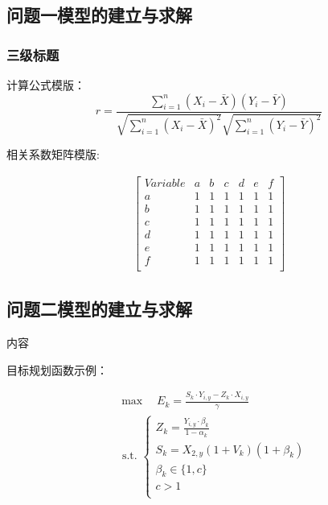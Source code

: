 \documentclass[a4paper]{article}
\begin{document}
	\subsection{问题一模型的建立与求解}
	\subsubsection{三级标题}
	
	计算公式模版：
	\begin{equation}
		r=\frac{\sum_{i=1}^n\left(X_i-\bar{X}\right)\left(Y_i-\bar{Y}\right)}{\sqrt{\sum_{i=1}^n\left(X_i-\bar{X}\right)^2} \sqrt{\sum_{i=1}^n\left(Y_i-\bar{Y}\right)^2}}
	\end{equation}
	
	相关系数矩阵模版:
	
	\begin{gather*}
		\begin{bmatrix}
			Variable & a & b & c & d & e & f \\
			a & 1 & 1 & 1 & 1 & 1 & 1 \\
			b & 1 & 1 & 1 & 1 & 1 & 1 \\
			c & 1 & 1 & 1 & 1 & 1 & 1 \\
			d & 1 & 1 & 1 & 1 & 1 & 1 \\
			e & 1 & 1 & 1 & 1 & 1 & 1 \\
			f & 1 & 1 & 1 & 1 & 1 & 1 \\
		\end{bmatrix}
	\end{gather*}
 
 
	\subsection{问题二模型的建立与求解}
	
	内容
	
	目标规划函数示例：
	
	\begin{equation}
		\begin{aligned}
			& \max \quad E_k=\frac{S_k \cdot Y_{i, y}-Z_k \cdot X_{i, y}}{\gamma} \\
			& \text { s.t. }\left\{\begin{array}{l}
				Z_k=\frac{Y_{i, y} \cdot \beta_k}{1-\alpha_k} \\
				S_k=X_{2, y}\left(1+V_k\right)\left(1+\beta_k\right) \\
				\beta_k \in\{1, c\} \\
				c>1 \\
 
			\end{array}\right.
		\end{aligned}
	\end{equation}
	
\end{document}

